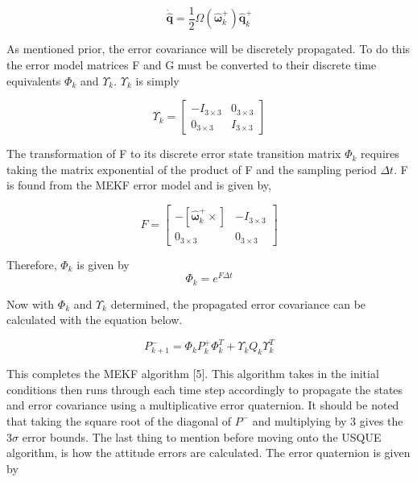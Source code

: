 \documentclass[12pt]{report}
\begin{document}
\begin{equation}
	\pmb{\dot{\hat{q}}} = \frac{1}{2}\Omega(\hat{\pmb{\omega}}_k^+)\pmb{\hat{q}}_k^+
\end{equation}  

\noindent As mentioned prior, the error covariance will be discretely propagated. To do this the error model matrices F and G must be converted to their discrete time equivalents $\Phi_k$ and $\Upsilon_k$. $\Upsilon_k$ is simply 

\begin{equation}
	\Upsilon_k= \begin{bmatrix}
	-I_{3\times3} & 0_{3\times3} \\
	0_{3\times3} & I_{3\times3}
	\end{bmatrix}
\end{equation}

\noindent The transformation of F to its discrete error state transition matrix $\Phi_k$ requires taking the matrix exponential of the product of F and the sampling period $\Delta t$. F is found from the MEKF error model and is given by,

\begin{equation}
	F = \begin{bmatrix}
		-[\hat{\pmb{\omega}}_k^+\times] & -I_{3\times3}\\
		0_{3\times3} & 0_{3\times3}
	\end{bmatrix}
\end{equation}

\noindent Therefore, $\Phi_k$ is given by 
\begin{equation}
	 \Phi_k = e^{F\Delta t}
\end{equation}  

\noindent Now with $\Phi_k$ and $\Upsilon_k$ determined, the propagated error covariance can be calculated with the equation below.  

\begin{equation}
	P_{k+1}^- = \Phi_kP_k^+\Phi_k^T + \Upsilon_kQ_k\Upsilon_k^T
\end{equation}  

\noindent This completes the MEKF algorithm [5]. This algorithm takes in the initial conditions then  runs through each time step accordingly to propagate the states and error covariance using a multiplicative error quaternion.  It should be noted that taking the square root of the diagonal of $P^-$ and multiplying by 3 gives the 3$\sigma$ error bounds. The last thing to mention before moving onto the USQUE algorithm, is how the attitude errors are calculated. The error quaternion is given by
\end{document}
